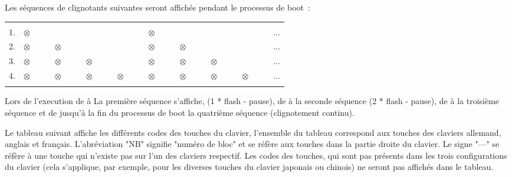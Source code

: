   Les séquences de clignotants suivantes seront affichés pendant le processus de boot~:

  {\def\led{\begin{math}\otimes\quad\quad\end{math}}
  \begin{tabular}{c l l l l l l l l l}
    \quad\\
    1. & \led & & & & \led & & & & ... \\
    2. & \led & \led & & & \led & \led & & & ... \\
    3. & \led & \led & \led & & \led & \led & \led & & ... \\
    4. & \led & \led & \led & \led & \led & \led & \led & \led & ... \\
    \quad 
  \end{tabular}}

  Lors de l'execution de  à  La première séquence s'affiche,\newline
  (1 * flash - pause),\newline
  de  à  la seconde séquence (2 * flash - pause),\newline
  de  à  la troisième séquence et\newline
  de  jusqu'à la fin du processus de boot la quatrième séquence
  (clignotement continu).


Le tableau suivant affiche les différents codes des touches du clavier, l'ensemble du
tableau correspond aux touches des claviers allemand, anglais et français. L'abréviation
"NB" signifie "numéro de bloc" et se réfère aux touches dans la partie droite du clavier.
Le signe "---" se réfère à une touche qui n'existe pas sur l'un des claviers respectif.
Les codes des touches, qui sont pas présents dans les trois configurations du clavier 
(cela s'applique, par exemple, pour les diverses touches du clavier japonais ou chinois)
ne seront pas affichés dans le tableau.

